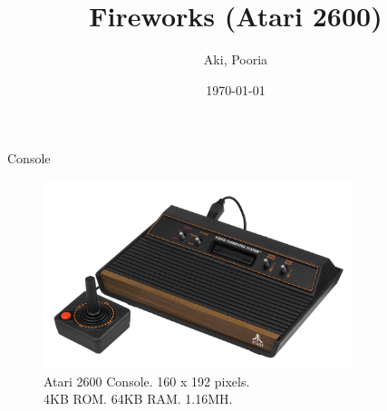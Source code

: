 \documentclass{beamer}
\title[Fireworks]{Fireworks (Atari 2600)}
\author{Aki, Pooria }
\institute[Metropolia UAS]{Metropolia University of Applied Sciences}
\date{\today}
\begin{document}
\begin{frame}
  \titlepage
\end{frame}





%
%


\begin{frame}{Console}
    \begin{figure}
        \centering
        \includegraphics[width=0.8\textwidth]{atari2600.png} %
        \caption{Atari 2600 Console. 160 x 192 pixels. \\ 4KB ROM. 64KB RAM. 1.16MH.}
    \end{figure}
\end{frame}
\end{document}
